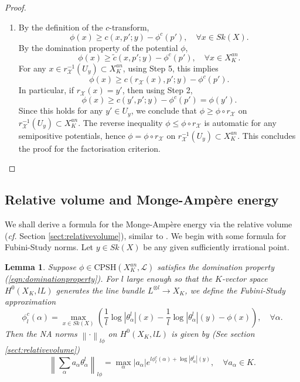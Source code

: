 \documentclass[a4paper]{article}
\newtheorem{lem}[thm]{Lemma}
\theoremstyle{definition}
\newcommand{\cf}{\emph{cf.} }
\newcommand{\norm}[1]{\left\lVert#1\right\rVert}
\begin{document}
\begin{proof}
\begin{enumerate}
\item  By the definition of the $c$-transform,
\[
\phi(x)\geq c(x,p'; y)- \phi^c(p'),\quad \forall x\in Sk(X).
\]
By the domination property of the  potential $\phi$, 
\[
\phi(x) \geq \tilde{c}(x,p'; y) - \phi^c(p'),\quad \forall x\in X_K^{an}.
\]
For any $x\in r_{\mathcal{X}}^{-1}(U_y)\subset X_K^{an}$, using Step 5,  this implies
\[
\phi(x) \geq c( r_\mathcal{X}(x) , p';y  )- \phi^c(p').
\]
In particular, if $r_{\mathcal{X}}(x)=y'$, then using Step 2,
\[
\phi(x) \geq c( y', p';y  )- \phi^c(p')= \phi(y').
\]
Since this holds for any $y'\in U_y$, we conclude that $\phi \geq \phi\circ r_{\mathcal{X}}$ on $r_{\mathcal{X}}^{-1}(U_y)\subset X_K^{an}.$ The reverse inequality $\phi\leq \phi\circ r_{\mathcal{X}}$ is automatic for any semipositive potentials, hence $\phi= \phi\circ r_{\mathcal{X}}$ on $r_{\mathcal{X}}^{-1}(U_y)\subset X_K^{an}.$
This concludes the proof for the factorisation criterion.

	\end{enumerate}
		

		
	\end{proof}
	
	
	
	
	\subsection{Relative volume and Monge-Amp\`ere energy}\label{sec:relativevolume}
	
	
	
	
	

	We shall derive a formula for the Monge-Amp\`ere energy via the relative volume  (\cf Section \ref{sect:relativevolume}), similar to \cite[Section 5.4]{Litheta}.
We begin with some formula for Fubini-Study norms. Let $y\in Sk(X)$ be any given sufficiently irrational point.
	
	
	
	
	
	
	\begin{lem}\label{lem:FSdiagonal}
		Suppose  $\phi\in \text{CPSH}(X_K^{an},\mathcal{L})$ satisfies  the domination property (\ref{eqn:dominationproperty}).
		For $l$ large enough so that the $K$-vector space $H^0(X_K,lL)$ generates the line bundle $L^{\otimes l}\to X_K$, we define the Fubini-Study approximation
		\begin{equation}\label{eqn:phicl}
			\phi^c_l(\alpha)= \max_{x\in Sk(X)} (  \frac{1}{l} \log |\theta_\alpha^l|(x)-  \frac{1}{l} \log |\theta_\alpha^l|(y)-   \phi(x)),\quad \forall \alpha.
		\end{equation}
		Then the NA norms $\norm{\cdot}_{l\phi}$ on  $H^0(X_K,lL)$   is given by (See section \ref{sect:relativevolume})
		\[
		\norm{ \sum_{\alpha } a_\alpha \theta_\alpha^l }_{l\phi}= \max_\alpha |a_\alpha | e^{l \phi^c_l(\alpha) + \log |\theta_\alpha^l|(y) },\quad \forall a_\alpha \in K.
		\]
	\end{lem}
	
\end{document}
